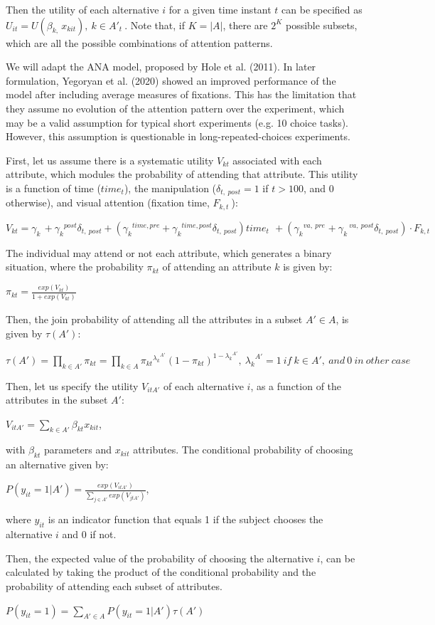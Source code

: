 Then the utility of each alternative \(i\) for a given time instant \(t\) can be specified as \(U_{it} = U(\beta_{k,\ }x_{kit}),\ k \in A'_{t}\ \). Note that, if \(K = |A|\), there are \(2^{K}\) possible subsets, which are all the possible combinations of attention patterns.

We will adapt the ANA model, proposed by Hole et al. (2011). In later formulation, Yegoryan et al. (2020) showed an improved performance of the model after including average measures of fixations. This has the limitation that they assume no evolution of the attention pattern over the experiment, which may be a valid assumption for typical short experiments (e.g. 10 choice tasks). However, this assumption is questionable in long-repeated-choices experiments.

First, let us assume there is a systematic utility \(V_{kt}\) associated with each attribute, which modules the probability of attending that attribute. This utility is a function of time (\(time_{t}\)), the manipulation (\(\delta_{t,\ post} = 1\) if \(t > 100\), and 0 otherwise), and visual attention (fixation time, \(F_{k,t}\ \)):

\(V_{kt} = \gamma_{k\ } + {\gamma_{k}}^{post}\delta_{t,\ post} + ({\gamma_{k}}^{time,pre} + {\gamma_{k}}^{time,post}\delta_{t,\ post})time_{t\ }\  + ({{\gamma_{k}}^{va,\ pre}}^{} + {\gamma_{k}}^{\ va,\ post}\delta_{t,\ post}) \cdot F_{k,t}\ \)

The individual may attend or not each attribute, which generates a binary situation, where the probability \(\pi_{kt}\) of attending an attribute \(k\) is given by:

\({\pi_{kt} = \frac{exp(V_{kt})}{1 + exp(V_{kt})}\ \ }_{}\ \)

Then, the join probability of attending all the attributes in a subset \(A' \in A\), is given by \(\tau(A'):\)

\(\tau(A') = \prod_{k \in A'}^{}\pi_{kt} = \prod_{k \in A}^{}{\pi_{kt}}^{{\lambda_{k}}^{A'}}(1 - \pi_{kt})^{1 - {\lambda_{k}}^{A'}},\ {\lambda_{k}}^{A'} = 1\ if\ k \in A',\ and\ 0\ in\ other\ case\)

Then, let us specify the utility \(V_{itA'}\) of each alternative \(i\), as a function of the attributes in the subset \(A'\):

\(V_{itA'} = \sum_{k \in A'}^{}\beta_{kt}x_{kit}\),

with \(\beta_{kt}\) parameters and \(x_{kit}\) attributes. The conditional probability of choosing an alternative given by:

\(P(y_{it} = 1|A') = \frac{exp(V_{itA'})}{\sum_{j \in A'}^{}exp(V_{jtA'})}\),

where \(y_{it}\) is an indicator function that equals 1 if the subject chooses the alternative \(i\) and 0 if not.

Then, the expected value of the probability of choosing the alternative \(i\), can be calculated by taking the product of the conditional probability and the probability of attending each subset of attributes.

\(P(y_{it} = 1) = \sum_{A' \in A}^{}P(y_{it} = 1|A')\tau(A')\)
